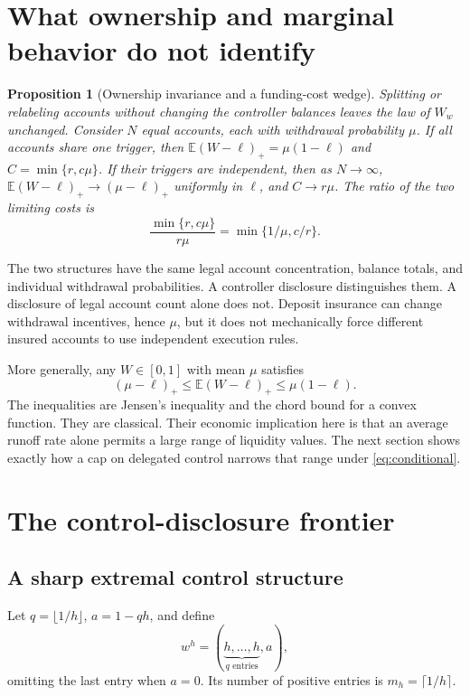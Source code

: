 \documentclass[11pt]{article}
\newtheorem{proposition}[theorem]{Proposition}
\theoremstyle{definition}\newtheorem{definition}[theorem]{Definition}
\newcommand{\E}{\mathbb E}
\newcommand{\pos}[1]{\left(#1\right)_+}
\begin{document}
\section{What ownership and marginal behavior do not identify}
\begin{proposition}[Ownership invariance and a funding-cost wedge]\label{prop:ownership}
Splitting or relabeling accounts without changing the controller balances leaves the law of \(W_w\) unchanged. Consider \(N\) equal accounts, each with withdrawal probability \(\mu\). If all accounts share one trigger, then
\(\E\pos{W-\ell}=\mu(1-\ell)\) and
\(C=\min\{r,c\mu\}\).
If their triggers are independent, then as \(N\to\infty\),
\(\E\pos{W-\ell}\to\pos{\mu-\ell}\) uniformly in \(\ell\), and \(C\to r\mu\).
The ratio of the two limiting costs is
\begin{equation}
 \frac{\min\{r,c\mu\}}{r\mu}=\min\{1/\mu,c/r\}.
 \label{eq:ratio}
\end{equation}
\end{proposition}
The two structures have the same legal account concentration, balance totals, and individual withdrawal probabilities. A controller disclosure distinguishes them. A disclosure of legal account count alone does not. Deposit insurance can change withdrawal incentives, hence \(\mu\), but it does not mechanically force different insured accounts to use independent execution rules.

More generally, any \(W\in[0,1]\) with mean \(\mu\) satisfies
\begin{equation}
 \pos{\mu-\ell}\leq\E\pos{W-\ell}\leq\mu(1-\ell).
 \label{eq:generic}
\end{equation}
The inequalities are Jensen's inequality and the chord bound for a convex function. They are classical. Their economic implication here is that an average runoff rate alone permits a large range of liquidity values. The next section shows exactly how a cap on delegated control narrows that range under \eqref{eq:conditional}.

\section{The control-disclosure frontier}
\subsection{A sharp extremal control structure}
Let \(q=\lfloor1/h\rfloor\), \(a=1-qh\), and define
\begin{equation}
 w^h=(\underbrace{h,\ldots,h}_{q\text{ entries}},a),
 \label{eq:extreme}
\end{equation}
omitting the last entry when \(a=0\). Its number of positive entries is \(m_h=\lceil1/h\rceil\).
\end{document}
